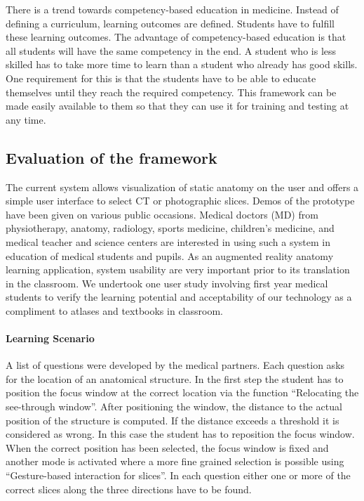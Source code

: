 {{{{{There is a trend towards competency-based education in medicine. Instead of defining a curriculum, learning outcomes are defined. Students have to fulfill these learning outcomes. The advantage of competency-based education is that all students will have the same competency in the end. A student who is less skilled has to take more time to learn than a student who already has good skills. One requirement for this is that the students have to be able to educate themselves until they reach the required competency. 
This framework can be made easily available to them so that they can use it for training and testing at any time.
	
\subsection{Evaluation of the framework}
The current system allows visualization of static anatomy on the user and offers a simple user interface to select CT or photographic slices. Demos of the prototype have been given on various public occasions. Medical doctors (MD) from physiotherapy, anatomy, radiology, sports medicine, children's medicine, and medical teacher and science centers are interested in using such a system in education of medical students and pupils. 
As an augmented reality anatomy learning application, system usability are very important prior to its translation in the classroom. We undertook one user study involving first year medical students to verify the learning potential and acceptability of our technology as a compliment to atlases and textbooks in classroom.

\paragraph{Learning Scenario} A list of questions were developed by the medical partners. Each question asks for the location of an anatomical structure. 
In the first step the student has to position the focus window at the correct location via the function ``Relocating the see-through window''. After positioning the window, the distance to the actual position of the structure is computed. If the distance exceeds a threshold it is considered as wrong. In this case the student has to reposition the focus window. When the correct position has been selected, the focus window is fixed and another mode is activated where a more fine grained selection is possible using ``Gesture-based interaction for slices''. 
In each question either one or more of the correct slices along the three directions have to be found. 

}}}}}
